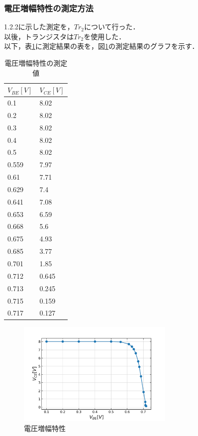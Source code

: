 \documentclass[10pt, a4j, dvipdfmx]{jarticle}
\begin{document}
    \subsubsection{電圧増幅特性の測定方法}
    1.2.2に示した測定を，$Tr_2$について行った．\\
    以後，トランジスタは$Tr_2$を使用した．\\
    以下，表\ref{tbl:10}に測定結果の表を，図\ref{ex:10}の測定結果のグラフを示す．
    \begin{table}[H]
        \centering
        \caption{電圧増幅特性の測定値}
        \label{tbl:10}
        \small
        \begin{tabular}{|l|l|}
        \hline
        $V_{BE}[V]$ & $V_{CE}[V]$ \\ \hline
        0.1         & 8.02        \\ \hline
        0.2         & 8.02        \\ \hline
        0.3         & 8.02        \\ \hline
        0.4         & 8.02        \\ \hline
        0.5         & 8.02        \\ \hline
        0.559       & 7.97        \\ \hline
        0.61        & 7.71        \\ \hline
        0.629       & 7.4         \\ \hline
        0.641       & 7.08        \\ \hline
        0.653       & 6.59        \\ \hline
        0.668       & 5.6         \\ \hline
        0.675       & 4.93        \\ \hline
        0.685       & 3.77        \\ \hline
        0.701       & 1.85        \\ \hline
        0.712       & 0.645       \\ \hline
        0.713       & 0.245       \\ \hline
        0.715       & 0.159       \\ \hline
        0.717       & 0.127       \\ \hline
        \end{tabular}
        \normalsize
    \end{table}
    \begin{figure}[H]
        \centering
        \includegraphics[height=50mm]{ex-10.png}
        \caption{電圧増幅特性}
        \label{ex:10}
    \end{figure}
\end{document}
